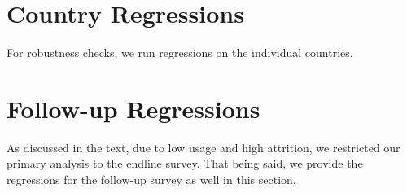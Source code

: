 \documentclass{article}
\begin{document}












\section{Country Regressions}

For robustness checks, we run regressions on the individual countries.


















\section{Follow-up Regressions}

As discussed in the text, due to low usage and high attrition, we restricted our primary analysis to the endline survey. That being said, we provide the regressions for the follow-up survey as well in this section.








\end{document}
